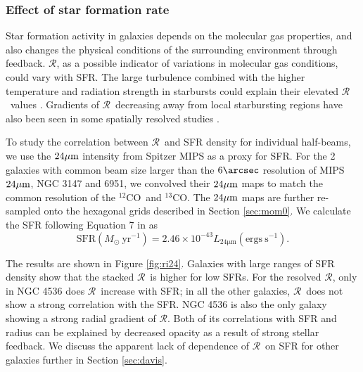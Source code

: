 \documentclass{emulateapj}
\def\beq{\begin{equation}}
\def\eeq{\end{equation}}
\def\ttco{\mbox{$^{13}$CO}}
\def\twco{\mbox{$^{12}$CO}}
\def\rtt{$\mathcal{R}$}
\begin{document}
\subsubsection{Effect of star formation rate}
\begin{figure*}[ht]
\caption{
Line intensity ratio \rtt \ distribution as a function of SFR.
The first 11 panels show the results for each individual galaxy in 
the similar manner as Figure \ref{fig:rradius}. 
In the last panel, colored circles are the trends of stacked \rtt; 
the black solid line is the linear function provided by Equation
1 of \citet{Davis2014}, which results from fitting measurements of 
\rtt \ and star formation rate reported for galaxies in the literature; 
gray diamonds are the reported values for galaxies in Table 1 of 
\citet{Davis2014}.  
}
\label{fig:ri24}
\end{figure*}

Star formation activity in galaxies depends on the molecular gas 
properties, and also changes the physical conditions of the surrounding 
environment through feedback. 
\rtt, as a possible indicator of variations in molecular gas conditions, 
could vary with SFR. 
The large turbulence combined with the higher temperature 
and radiation strength in starbursts could explain their 
elevated \rtt \ values \citep{Aalto1995}. 
Gradients of \rtt \ decreasing away from local starbursting 
regions have also been seen in some  spatially 
resolved studies \citep{Aalto2010, Hirota2010, Watanabe2011}.

To study the correlation between \rtt \ 
and SFR density for individual half-beams, 
we use the $24 \rm \mu m $ intensity from Spitzer MIPS as a proxy for SFR.
For the 2 galaxies with common beam size larger than the $6 \arcsec$ resolution of MIPS $24 \rm \mu m $, NGC 3147 and 6951, we convolved their $24 \rm \mu m $ maps to match the common resolution of the \twco \ and \ttco.
The $24 \rm \mu m $ maps are 
further re-sampled onto the hexagonal grids described in Section \ref{sec:mom0}. 
We calculate the SFR following Equation 7 in \citet{Calzetti2010} as 
\beq
\mathrm{SFR}(M_{\odot} \ \mathrm{yr^{-1}}) = 2.46 \times 10^{-43} L_{24 
\mathrm{\mu m}} (\mathrm{ergs \ s^{-1}}).
\eeq

The results are shown in Figure \ref{fig:ri24}. 
Galaxies with large ranges of SFR density show that the stacked \rtt \ is higher for low SFRs. 
For the resolved \rtt,  only in NGC 4536 does \rtt \ increase with SFR; in all the other galaxies, \rtt \ does not show a strong correlation with the SFR. NGC 4536 is also the only galaxy showing a strong radial gradient of \rtt. Both of its correlations with SFR and radius can be explained by decreased opacity as a result of strong stellar feedback. We discuss the apparent lack of dependence of \rtt\ on SFR for other galaxies further in Section \ref{sec:davis}. 
\end{document}
